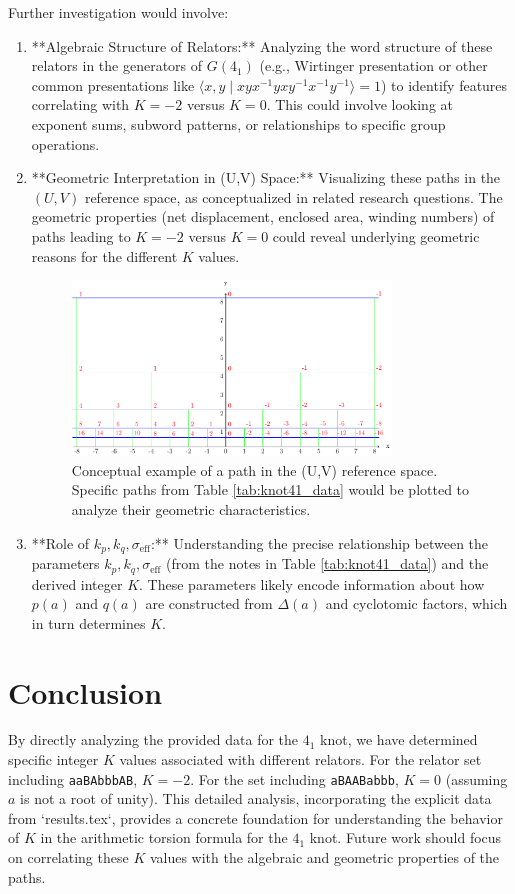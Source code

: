 \documentclass{article}
\begin{document}
Further investigation would involve:
\begin{enumerate}
    \item **Algebraic Structure of Relators:** Analyzing the word structure of these relators in the generators of $G(4_1)$ (e.g., Wirtinger presentation or other common presentations like $\langle x,y \mid xyx^{-1}yxy^{-1}x^{-1}y^{-1} \rangle = 1$) to identify features correlating with $K=-2$ versus $K=0$. This could involve looking at exponent sums, subword patterns, or relationships to specific group operations.
    \item **Geometric Interpretation in (U,V) Space:** Visualizing these paths in the $(U,V)$ reference space, as conceptualized in related research questions. The geometric properties (net displacement, enclosed area, winding numbers) of paths leading to $K=-2$ versus $K=0$ could reveal underlying geometric reasons for the different $K$ values.
    \begin{figure}[h!]
        \centering
        \includegraphics[width=0.8\textwidth]{figures/01-grid-example-1.pdf} 
        \caption{Conceptual example of a path in the (U,V) reference space. Specific paths from Table \ref{tab:knot41_data} would be plotted to analyze their geometric characteristics.}
        \label{fig:uv_path}
    \end{figure}
    \item **Role of $k_p, k_q, \sigma_{\text{eff}}$:** Understanding the precise relationship between the parameters $k_p, k_q, \sigma_{\text{eff}}$ (from the notes in Table \ref{tab:knot41_data}) and the derived integer $K$. These parameters likely encode information about how $p(a)$ and $q(a)$ are constructed from $\Delta(a)$ and cyclotomic factors, which in turn determines $K$.
\end{enumerate}

\section{Conclusion}
By directly analyzing the provided data for the $4_1$ knot, we have determined specific integer $K$ values associated with different relators. For the relator set including \texttt{aaBAbbbAB}, $K=-2$. For the set including \texttt{aBAABabbb}, $K=0$ (assuming $a$ is not a root of unity). This detailed analysis, incorporating the explicit data from `results.tex`, provides a concrete foundation for understanding the behavior of $K$ in the arithmetic torsion formula for the $4_1$ knot. Future work should focus on correlating these $K$ values with the algebraic and geometric properties of the paths.
\end{document}
